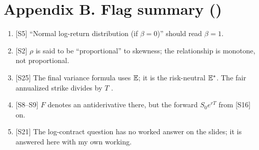 \documentclass[10pt]{article}
\begin{document}
\section*{Appendix B. Flag summary (\flag)}
\begin{enumerate}
\item {}[S5] ``Normal log-return distribution (if $\beta=0$)'' should read $\beta=1$.
\item {}[S2] $\rho$ is said to be ``proportional'' to skewness; the relationship is monotone, not proportional.
\item {}[S25] The final variance formula uses $\mathbb{E}$; it is the risk-neutral $\mathbb{E}^*$. The fair annualized strike divides by $T$ \beyond.
\item {}[S8--S9] $F$ denotes an antiderivative there, but the forward $S_0e^{rT}$ from [S16] on.
\item {}[S21] The log-contract question has no worked answer on the slides; it is answered here with my own working.
\end{enumerate}
\end{document}
